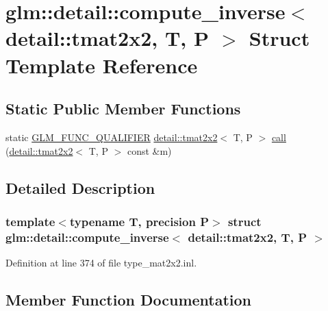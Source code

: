 \hypertarget{structglm_1_1detail_1_1compute__inverse_3_01detail_1_1tmat2x2_00_01_t_00_01_p_01_4}{}\section{glm\+:\+:detail\+:\+:compute\+\_\+inverse$<$ detail\+:\+:tmat2x2, T, P $>$ Struct Template Reference}
\label{structglm_1_1detail_1_1compute__inverse_3_01detail_1_1tmat2x2_00_01_t_00_01_p_01_4}
\subsection*{Static Public Member Functions}
\begin{DoxyCompactItemize}
\item 
static \hyperlink{setup_8hpp_a33fdea6f91c5f834105f7415e2a64407}{G\+L\+M\+\_\+\+F\+U\+N\+C\+\_\+\+Q\+U\+A\+L\+I\+F\+I\+ER} \hyperlink{structglm_1_1detail_1_1tmat2x2}{detail\+::tmat2x2}$<$ T, P $>$ \hyperlink{structglm_1_1detail_1_1compute__inverse_3_01detail_1_1tmat2x2_00_01_t_00_01_p_01_4_ab9c06b142ec7941cda76021e09240f30}{call} (\hyperlink{structglm_1_1detail_1_1tmat2x2}{detail\+::tmat2x2}$<$ T, P $>$ const \&m)
\end{DoxyCompactItemize}


\subsection{Detailed Description}
\subsubsection*{template$<$typename T, precision P$>$\newline
struct glm\+::detail\+::compute\+\_\+inverse$<$ detail\+::tmat2x2, T, P $>$}



Definition at line 374 of file type\+\_\+mat2x2.\+inl.



\subsection{Member Function Documentation}
\mbox{\label{structglm_1_1detail_1_1compute__inverse_3_01detail_1_1tmat2x2_00_01_t_00_01_p_01_4_ab9c06b142ec7941cda76021e09240f30}} 
